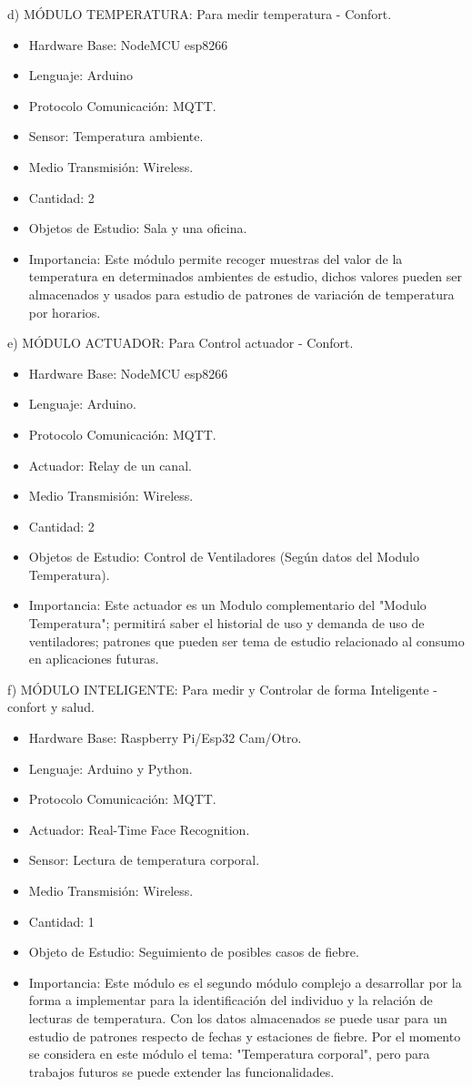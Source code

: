 \documentclass[11pt]{charter}
\begin{document}
d) MÓDULO TEMPERATURA: Para medir temperatura - Confort.
\begin{itemize}
\item Hardware Base: NodeMCU esp8266
\item Lenguaje: Arduino
\item Protocolo Comunicación: MQTT.
\item Sensor: Temperatura ambiente.
\item Medio Transmisión: Wireless.
\item Cantidad: 2
\item Objetos de Estudio: Sala y una oficina.
\item Importancia: Este módulo permite recoger muestras del valor de la temperatura en determinados ambientes de estudio, dichos valores pueden ser almacenados y usados para estudio de patrones de variación de temperatura por horarios.
\end{itemize}

e) MÓDULO ACTUADOR: Para Control actuador - Confort.
\begin{itemize}
\item Hardware Base: NodeMCU esp8266
\item Lenguaje: Arduino.
\item Protocolo Comunicación: MQTT.
\item Actuador: Relay de un canal.
\item Medio Transmisión: Wireless.
\item Cantidad: 2
\item Objetos de Estudio: Control de Ventiladores (Según datos del Modulo Temperatura).
\item Importancia: Este actuador es un Modulo complementario del "Modulo Temperatura"; permitirá saber el historial de uso y demanda de uso de ventiladores; patrones que pueden ser tema de estudio relacionado al consumo en aplicaciones futuras.
\end{itemize}

f) MÓDULO INTELIGENTE: Para medir y Controlar de forma Inteligente - confort y salud.
\begin{itemize}
\item Hardware Base: Raspberry Pi/Esp32 Cam/Otro.
\item Lenguaje: Arduino y Python.
\item Protocolo Comunicación: MQTT.
\item Actuador: Real-Time Face Recognition.
\item Sensor: Lectura de temperatura corporal.
\item Medio Transmisión: Wireless.
\item Cantidad: 1
\item Objeto de Estudio: Seguimiento de posibles casos de fiebre.
\item Importancia: Este módulo es el segundo módulo complejo a desarrollar por la forma a implementar para la identificación del individuo y la relación de lecturas de temperatura. Con los datos almacenados se puede usar para un estudio de patrones respecto de fechas y estaciones de fiebre. Por el momento se considera en este módulo el tema: "Temperatura corporal", pero para trabajos futuros se puede extender las funcionalidades.
\end{itemize}
\end{document}
